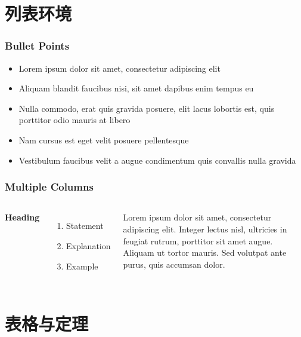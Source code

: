 \documentclass[11pt,compress]{beamer}
\numberwithin{thm}{section}
\numberwithin{defn}{section}
\numberwithin{lmm}{section}
\theoremstyle{example}
\numberwithin{figure}{section}
\numberwithin{table}{section}
\numberwithin{equation}{section}
\begin{document}
\section{列表环境}

\begin{frame}
\frametitle{Bullet Points}
\begin{itemize}[<+-| alert@+>]
\item Lorem ipsum dolor sit amet, consectetur adipiscing elit
\item Aliquam blandit faucibus nisi, sit amet dapibus enim tempus eu
\item Nulla commodo, erat quis gravida posuere, elit lacus lobortis est, quis porttitor odio mauris at libero
\item Nam cursus est eget velit posuere pellentesque
\item Vestibulum faucibus velit a augue condimentum quis convallis nulla gravida
\end{itemize}
\end{frame}


\begin{frame}
\frametitle{Multiple Columns}
\begin{columns}[c] %

\textbf{Heading}
\begin{enumerate}
\item Statement
\item Explanation
\item Example
\end{enumerate}

Lorem ipsum dolor sit amet, consectetur adipiscing elit. Integer lectus nisl, ultricies in feugiat rutrum, porttitor sit amet augue. Aliquam ut tortor mauris. Sed volutpat ante purus, quis accumsan dolor.

\end{columns}
\end{frame}

\section{表格与定理}
\end{document}
